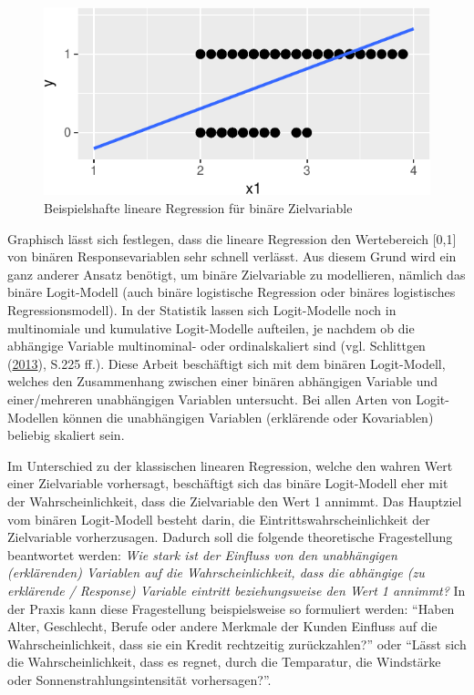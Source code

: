 \documentclass[12pt,]{article}
\begin{document}
\begin{figure}[h]

{\centering \includegraphics{logisticRegression_files/figure-latex/unnamed-chunk-1-1} 

}

\caption{Beispielshafte lineare Regression für binäre Zielvariable}\label{fig:unnamed-chunk-1}
\end{figure}

Graphisch lässt sich festlegen, dass die lineare Regression den
Wertebereich {[}0,1{]} von binären Responsevariablen sehr schnell
verlässt. Aus diesem Grund wird ein ganz anderer Ansatz benötigt, um
binäre Zielvariable zu modellieren, nämlich das binäre Logit-Modell
(auch binäre logistische Regression oder binäres logistisches
Regressionsmodell). In der Statistik lassen sich Logit-Modelle noch in
multinomiale und kumulative Logit-Modelle aufteilen, je nachdem ob die
abhängige Variable multinominal- oder ordinalskaliert sind (vgl.
Schlittgen
(\protect\hyperlink{ref-schlittgen2013regressionsanalysen}{2013}), S.225
ff.). Diese Arbeit beschäftigt sich mit dem binären Logit-Modell,
welches den Zusammenhang zwischen einer binären abhängigen Variable und
einer/mehreren unabhängigen Variablen untersucht. Bei allen Arten von
Logit-Modellen können die unabhängigen Variablen (erklärende oder
Kovariablen) beliebig skaliert sein.

Im Unterschied zu der klassischen linearen Regression, welche den wahren
Wert einer Zielvariable vorhersagt, beschäftigt sich das binäre
Logit-Modell eher mit der Wahrscheinlichkeit, dass die Zielvariable den
Wert 1 annimmt. Das Hauptziel vom binären Logit-Modell besteht darin,
die Eintrittswahrscheinlichkeit der Zielvariable vorherzusagen. Dadurch
soll die folgende theoretische Fragestellung beantwortet werden:
\emph{Wie stark ist der Einfluss von den unabhängigen (erklärenden)
Variablen auf die Wahrscheinlichkeit, dass die abhängige (zu erklärende
/ Response) Variable eintritt beziehungsweise den Wert 1 annimmt?} In
der Praxis kann diese Fragestellung beispielsweise so formuliert werden:
``Haben Alter, Geschlecht, Berufe oder andere Merkmale der Kunden
Einfluss auf die Wahrscheinlichkeit, dass sie ein Kredit rechtzeitig
zurückzahlen?'' oder ``Lässt sich die Wahrscheinlichkeit, dass es
regnet, durch die Temparatur, die Windstärke oder
Sonnenstrahlungsintensität vorhersagen?''. \newpage 
\end{document}
